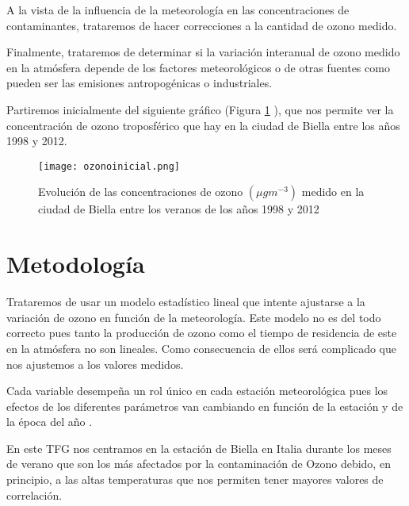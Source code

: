 \documentclass[12pt]{article}
\begin{document}
A la vista de la influencia de la meteorología en las concentraciones de contaminantes, trataremos de hacer correcciones a la cantidad de ozono  medido. 

Finalmente, trataremos de determinar si la variación interanual de  ozono medido en la atmósfera depende de los factores meteorológicos o de otras fuentes como pueden ser las emisiones antropogénicas o industriales.

Partiremos inicialmente del siguiente gráfico (Figura \ref{fig:2} ), que nos permite ver la concentración de ozono troposférico que hay en la ciudad de Biella entre los años 1998 y 2012.

\newpage

\begin{figure}[h!]
\centering
    \texttt{[image: ozonoinicial.png]}
    \caption[Cantidad de Ozono medido en Biella]{Evolución de las concentraciones de ozono $(\mu g  m^{-3})$ medido en la ciudad de Biella entre los veranos de los años 1998 y 2012}\label{fig:2}
\end{figure}




\section{Metodología} \label{sec:metodología}

Trataremos de usar un modelo estadístico lineal  que intente ajustarse a la variación de ozono en función de la meteorología. Este modelo no es del todo correcto pues  tanto  la producción de ozono como el tiempo de residencia  de este en la atmósfera no son lineales. Como consecuencia de ellos será complicado  que nos ajustemos a los valores medidos.

Cada variable desempeña un rol único en cada estación meteorológica pues los efectos de los diferentes parámetros van cambiando en función de la estación y de la época del año \citep{ordonez2005}. %

En este TFG nos centramos en la estación de Biella en Italia  durante los meses de verano que son los más afectados por la contaminación de Ozono debido, en principio,  a las altas  temperaturas que  nos permiten tener mayores valores de correlación.
\end{document}
